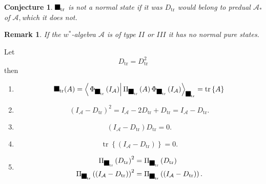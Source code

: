 \documentclass[aps,preprint]{revtex4}%
\providecommand{\U}[1]{\protect\rule{.1in}{.1in}}
\newtheorem{conjecture}[theorem]{Conjecture}
\newtheorem{remark}[theorem]{Remark}
\begin{document}
\begin{conjecture}
$\U{3c6} _{\operatorname*{tr}}$ is not a normal state if it was
$D_{\operatorname*{tr}}$ would belong to predual $\mathcal{A}_{\ast}$ of
$\mathcal{A,}$which it does not.
\end{conjecture}

\begin{remark}
If the $w^{\ast}$-algebra $\mathcal{A}$ is of type $II$ or $III$ it has
\emph{no normal pure states}.
\end{remark}

Let
\begin{equation}
D_{\operatorname*{tr}}=D_{\operatorname*{tr}}^{2}%
\end{equation}
then

\begin{enumerate}
\item
\begin{equation}
\U{3c6} _{\operatorname*{tr}}(A)=\left\langle \left.  \Phi_{\U{3c6}
_{\operatorname*{tr}}}\left(  I_{\mathcal{A}}\right)  \right\vert \Pi_{\U{3c6}
_{\operatorname*{tr}}}\left(  A\right)  \Phi_{\U{3c6} _{\operatorname*{tr}}%
}\left(  I_{\mathcal{A}}\right)  \right\rangle _{\U{3c6} _{\operatorname*{tr}%
}}=\operatorname*{tr}\left\{  A\right\}
\end{equation}


\item
\begin{equation}
\left(  I_{\mathcal{A}}-D_{\operatorname*{tr}}\right)  ^{2}=I_{\mathcal{A}%
}-2D_{\operatorname*{tr}}+D_{\operatorname*{tr}}=I_{\mathcal{A}}%
-D_{\operatorname*{tr}}.
\end{equation}


\item
\begin{equation}
\left(  I_{\mathcal{A}}-D_{\operatorname*{tr}}\right)  D_{\operatorname*{tr}%
}=0.
\end{equation}


\item
\begin{equation}
\operatorname*{tr}\left\{  \left(  I_{\mathcal{A}}-D_{\operatorname*{tr}%
}\right)  \right\}  =0.
\end{equation}


\item
\begin{align}
\Pi_{\U{3c6} _{\operatorname*{tr}}}\left(  D_{\operatorname*{tr}}\right)
^{2}  &  =\Pi_{\U{3c6} _{\operatorname*{tr}}}\left(  D_{\operatorname*{tr}%
}\right) \\
\Pi_{\U{3c6} _{\operatorname*{tr}}}\left(  \left(  I_{\mathcal{A}%
}-D_{\operatorname*{tr}}\right)  \right)  ^{2}  &  =\Pi_{\U{3c6}
_{\operatorname*{tr}}}\left(  \left(  I_{\mathcal{A}}-D_{\operatorname*{tr}%
}\right)  \right)  .
\end{align}



\end{enumerate}
\end{document}
